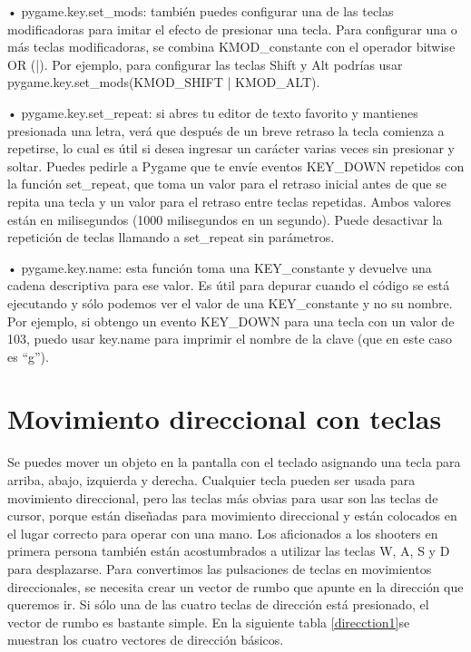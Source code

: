{•  {\ttfamily pygame.key.set\_mods}: también puedes configurar una de las teclas modificadoras para imitar el
efecto de presionar una tecla. Para configurar una o más teclas modificadoras, se combina  {\ttfamily KMOD\_constante}
con el operador {\ttfamily bitwise OR (|)}. Por ejemplo, para configurar las teclas Shift y Alt podrías usar 
{\ttfamily pygame.key.set\_mods(KMOD\_SHIFT | KMOD\_ALT)}.


•  {\ttfamily pygame.key.set\_repeat}: si abres tu editor de texto favorito y mantienes presionada una letra, 
verá que después de un breve retraso la tecla comienza a repetirse, lo cual es útil si desea ingresar un carácter 
varias veces sin presionar y soltar. Puedes pedirle a Pygame que te envíe eventos  {\ttfamily KEY\_DOWN} repetidos con 
la función {\ttfamily set\_repeat}, que toma un valor para el retraso inicial antes de que se repita una tecla y un valor para
el retraso entre teclas repetidas. Ambos valores están en milisegundos (1000 milisegundos
en un segundo). Puede desactivar la repetición de teclas llamando a  {\ttfamily set\_repeat} sin parámetros.


•  {\ttfamily pygame.key.name}: esta función toma una  {\ttfamily KEY\_constante} y devuelve una cadena  descriptiva
para ese valor. Es útil para depurar cuando el código se está ejecutando y sólo podemos ver el valor de una  {\ttfamily KEY\_constante}  y no su nombre. Por ejemplo, si obtengo un evento  {\ttfamily KEY\_DOWN} para una tecla con un valor de 103, puedo usar  {\ttfamily key.name} para imprimir el nombre de la clave (que en este caso es “g”).

\section{Movimiento direccional con teclas}

Se puedes mover un objeto en la pantalla con el teclado asignando una tecla para arriba, abajo, izquierda y derecha. 
Cualquier tecla pueden ser usada  para movimiento direccional, pero las teclas más obvias para usar son las teclas de cursor, porque
están diseñadas para movimiento direccional y están colocados en el lugar correcto para operar con una mano. 
Los aficionados a los shooters en primera persona también están acostumbrados a utilizar las teclas W, A, S y D para desplazarse.
Para convertimos las pulsaciones de teclas en movimientos direccionales, se necesita crear un vector de rumbo que apunte en la
dirección que queremos ir. Si sólo una de las cuatro teclas de dirección está presionado, el vector de rumbo es bastante simple. 
En la siguiente tabla \ref{direcction1}se muestran los cuatro vectores de dirección básicos.


}
